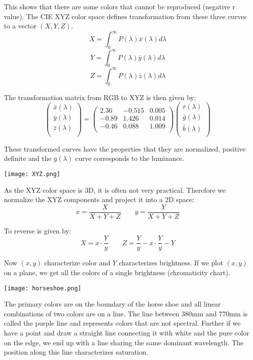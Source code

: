 This shows that there are some colors that cannot be reproduced (negative r value). The CIE XYZ color space defines transformation from these three curves to a vector $(X, Y, Z)$. 
$$X = \int_0^\infty P(\lambda) \bar x (\lambda) d\lambda$$
$$Y = \int_0^\infty P(\lambda) \bar y (\lambda) d\lambda$$
$$Z = \int_0^\infty P(\lambda) \bar z (\lambda) d\lambda$$

The transformation matrix from RGB to XYZ is then given by:
$$\begin{pmatrix}
	\bar x(\lambda) \\
	\bar y(\lambda) \\
	\bar z(\lambda) \\
\end{pmatrix}
=
\begin{pmatrix}
	2.36 & -0.515 & 0.005 \\
	-0.89 & 1.426 & 0.014 \\
	-0.46 & 0.088 & 1.009 \\
\end{pmatrix}
\begin{pmatrix}
	\bar r(\lambda) \\
	\bar g(\lambda) \\
	\bar b(\lambda) \\
\end{pmatrix}
$$

These transformed curves have the properties that they are normalized, positive definite and the $\bar y (\lambda)$ curve corresponds to the luminance.

\begin{center}
	\texttt{[image: XYZ.png]}
\end{center}

As the XYZ color space is 3D, it is often not very practical. Therefore we normalize the XYZ components and project it into a 2D space:
$$x = \frac{X}{X + Y + Z} \qquad y = \frac{Y}{X + Y + Z}$$

To reverse is given by:
$$X = x \cdot \frac{Y}{y} \qquad Z = \frac{Y}{y} - x \cdot \frac{Y}{y} - Y$$

Now $(x,y)$ characterize color and $Y$ characterizes brightness. If we plot $(x,y)$ on a plane, we get all the colors of a single brightness (chromaticity chart).
\begin{center}
	\texttt{[image: horseshoe.png]}
\end{center}
 
The primary colors are on the boundary of the horse shoe and all linear combinations of two colors are on a line. The line between 380mm and 770mm is called the purple line and represents colors that are not spectral. Further if we have a point and draw a straight line connecting it with white and the pure color on the edge, we end up with a line sharing the same dominant wavelength. The position along this line characterizes saturation. \medskip

